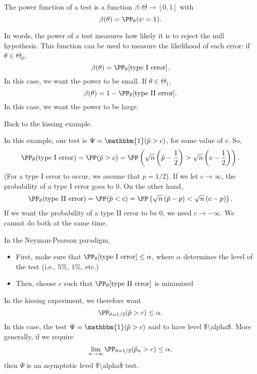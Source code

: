 \begin{definition}

The \ac{power function} of a test is a function $\beta: \Theta\rightarrow [0,1]$ with 
\[\beta(\theta) = \PP_{\theta}(\psi = 1).\]
\end{definition}
In words, the power of a test measures how likely it is to reject the null hypothesis. This function can be used to measure the likelihood of each error: if $\theta\in \Theta_0$, 
\[\beta(\theta) = \PP_{\theta}[\text{type I error}].\]
In this case, we want the power to be small. If $\theta\in \Theta_1$,
\[\beta(\theta) = 1 - \PP_{\theta}[\text{type II error}].\]
In this case, we want the power to be large. 

\begin{example}
\exlabel

Back to the kissing example.
\end{example}

In this example, our test is $\Psi = \mathbbm{1}(\hat{p} > c)$, for some value of $c$. So, 
\begin{align*}
    \PP_{\theta}(\text{type I error}) = \PP(\hat{p} > c) = \PP\left(\sqrt{n}\left(\hat{p}-\frac{1}{2}\right) > \sqrt{n}\left(c-\frac{1}{2}\right)\right).
\end{align*}
(For a type I error to occur, we assume that $p=1/2$). If we let $c\rightarrow \infty$, the probability of a type I error goes to $0$. On the other hand,
\begin{align*}
    \PP_{\theta}(\text{type II error}) = \PP(\hat{p} < c) = \PP\left(\sqrt{n}\left(\hat{p}-p\right) < \sqrt{n}\left(c-p\right)\right).
\end{align*}
If we want the probability of a type II error to be $0$, we need $c\rightarrow -\infty$. We cannot do both at the same time.

\begin{definition}

In the \ac{Neyman-Pearson paradigm},
\begin{itemize}
    \item First, make sure that $\PP_{\theta}[\text{type I error}]\leq \alpha$, where $\alpha$ determines the level of the test (i.e., $5\%$, $1\%$, etc.)
    \item Then, choose $c$ such that $\PP_{\theta}[\text{type II error}]$ is minimized
\end{itemize}
\end{definition}
In the kissing experiment, we therefore want 
\[\PP_{\theta = 1/2}(\hat{p} > c)\leq \alpha.\]
In this case, the test $\Psi = \mathbbm{1}(\hat{p} > c)$ said to have \ac{level $\alpha$}.
More generally, if we require
\[\lim_{n\rightarrow \infty}\PP_{\theta = 1/2}(\hat{p}_n > c)\leq \alpha,\]
then $\Psi$ is an \ac{asymptotic level $\alpha$} test.

